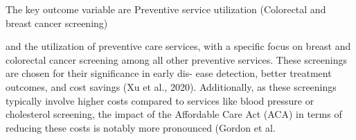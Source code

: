 \documentclass[../main.tex]{subfiles}
\begin{document}
 The key outcome variable are Preventive service utilization (Colorectal and breast cancer screening)

and the utilization of preventive
care services, with a specific focus on breast and colorectal cancer screening among all
other preventive services. These screenings are chosen for their significance in early dis-
ease detection, better treatment outcomes, and cost savings (Xu et al., 2020). Additionally,
as these screenings typically involve higher costs compared to services like blood pressure
or cholesterol screening, the impact of the Affordable Care Act (ACA) in terms of reducing
these costs is notably more pronounced (Gordon et al.
\end{document}
